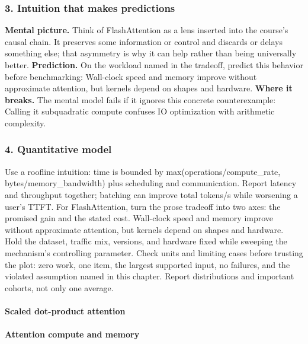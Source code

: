 \subsubsection*{3. Intuition that makes predictions}
\textbf{Mental picture.} Think of FlashAttention as a lens inserted into the course's causal chain. It preserves some information or control and discards or delays something else; that asymmetry is why it can help rather than being universally better.
\textbf{Prediction.} On the workload named in the tradeoff, predict this behavior before benchmarking: Wall-clock speed and memory improve without approximate attention, but kernels depend on shapes and hardware.
\textbf{Where it breaks.} The mental model fails if it ignores this concrete counterexample: Calling it subquadratic compute confuses IO optimization with arithmetic complexity.
\subsubsection*{4. Quantitative model}
Use a roofline intuition: time is bounded by max(operations/compute\_rate, bytes/memory\_bandwidth) plus scheduling and communication. Report latency and throughput together; batching can improve total tokens/s while worsening a user's TTFT.
For FlashAttention, turn the prose tradeoff into two axes: the promised gain and the stated cost. Wall-clock speed and memory improve without approximate attention, but kernels depend on shapes and hardware. Hold the dataset, traffic mix, versions, and hardware fixed while sweeping the mechanism's controlling parameter.
Check units and limiting cases before trusting the plot: zero work, one item, the largest supported input, no failures, and the violated assumption named in this chapter. Report distributions and important cohorts, not only one average.
\paragraph{Scaled dot-product attention}
\paragraph{Attention compute and memory}
